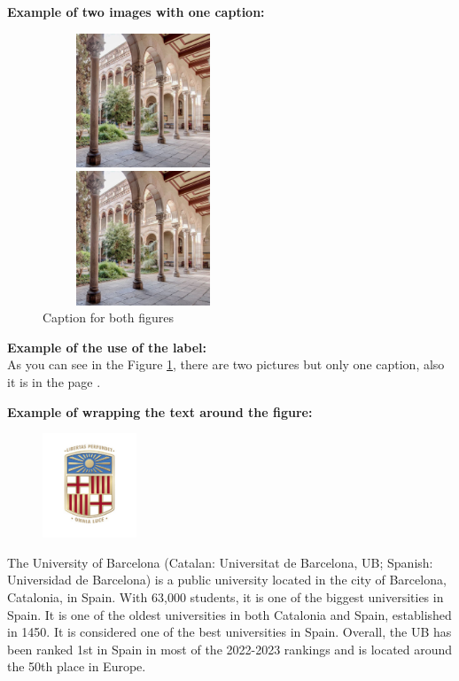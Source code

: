 \textbf{Example of two images with one caption:}
\begin{figure}[h]
  \centering
  \begin{minipage}{0.45\textwidth}
    \centering
    \includegraphics[width=6cm, height=4cm]{images/edifici-historic-universitat-de-barcelona.jpg}
  \end{minipage}
  \begin{minipage}{0.45\textwidth}
    \centering
    \includegraphics[width=6cm, height=4cm]{images/edifici-historic-universitat-de-barcelona.jpg}
  \end{minipage}
  \caption{Caption for both figures}
  \label{fig:two_images}
\end{figure}


\textbf{Example of the use of the label:} \\
As you can see in the Figure \ref{fig:two_images}, there are two pictures but only one caption, also it is in the page \pageref{fig:two_images}.


\textbf{Example of wrapping the text around the figure:}\\

\begin{figure} %
    \centering
    \includegraphics[width=0.25\textwidth]{preambles/static/ub_logo/ub_logo_3.png}
\end{figure}
The University of Barcelona (Catalan: Universitat de Barcelona, UB; Spanish: Universidad de Barcelona) is a public university located in the city of Barcelona, Catalonia, in Spain. With 63,000 students, it is one of the biggest universities in Spain. It is one of the oldest universities in both Catalonia and Spain, established in 1450.
It is considered one of the best universities in Spain. Overall, the UB has been ranked 1st in Spain in most of the 2022-2023 rankings and is located around the 50th place in Europe. 


